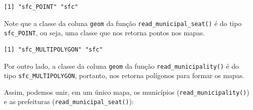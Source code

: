 \documentclass[
  brazilian,
]{book}
\newenvironment{Shaded}{\begin{snugshade}}{\end{snugshade}}
\newcommand{\AttributeTok}[1]{\textcolor[rgb]{0.77,0.63,0.00}{#1}}
\newcommand{\CommentTok}[1]{\textcolor[rgb]{0.56,0.35,0.01}{\textit{#1}}}
\newcommand{\ConstantTok}[1]{\textcolor[rgb]{0.00,0.00,0.00}{#1}}
\newcommand{\DecValTok}[1]{\textcolor[rgb]{0.00,0.00,0.81}{#1}}
\newcommand{\FunctionTok}[1]{\textcolor[rgb]{0.00,0.00,0.00}{#1}}
\newcommand{\NormalTok}[1]{#1}
\newcommand{\OtherTok}[1]{\textcolor[rgb]{0.56,0.35,0.01}{#1}}
\newcommand{\SpecialCharTok}[1]{\textcolor[rgb]{0.00,0.00,0.00}{#1}}
\newcommand{\StringTok}[1]{\textcolor[rgb]{0.31,0.60,0.02}{#1}}
\begin{document}
\begin{verbatim}
[1] "sfc_POINT" "sfc"      
\end{verbatim}

Note que a classe da coluna \texttt{geom} da função \texttt{read\_municipal\_seat()} é do tipo \texttt{sfc\_POINT}, ou seja, uma classe que nos retorna pontos nos mapas.

\begin{Shaded}
\end{Shaded}

\begin{verbatim}
[1] "sfc_MULTIPOLYGON" "sfc"             
\end{verbatim}

Por outro lado, a classe da coluna \texttt{geom} da função \texttt{read\_municipality()} é do tipo \texttt{sfc\_MULTIPOLYGON}, portanto, nos retorna polígonos para formar os mapas.

Assim, podemos unir, em um único mapa, os municípios (\texttt{read\_municipality()}) e as prefeituras (\texttt{read\_municipal\_seat()}):
\end{document}
